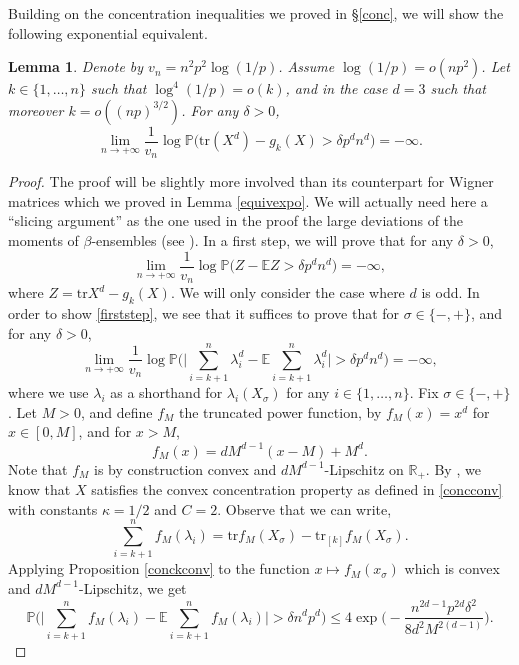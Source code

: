 \documentclass[aop,preprint]{imsart}
\newcommand\RR{\mathbb{R}}
\newcommand\PP{\mathbb{P}}
\newcommand\EE{\mathbb{E}}
\newcommand\tr{\mathrm{tr}}
\numberwithin{equation}{section}
\theoremstyle{definition}
\theoremstyle{plain}
\newtheorem{Lem}[Def]{Lemma}
\theoremstyle{remark}
\begin{document}
Building on the concentration inequalities we proved in \S \ref{conc}, we will show the following exponential equivalent.
\begin{Lem}\label{equiER}Denote by $v_n=n^2 p^2 \log (1/p)$. Assume $\log(1/p) = o(np^2)$. Let $k \in \{1,\ldots,n\}$ such that $  \log^4(1/p) = o(k)$, and in the case $d=3$ such that moreover $k =o((np)^{3/2})$. For any $\delta>0$,
$$ \lim_{n\to +\infty} \frac{1}{v_n} \log \PP\big( \tr (X^d) - g_k(X)>\delta p^dn^d\big) = -\infty.$$ 
\end{Lem}
\begin{proof}
The proof will be slightly more involved than its counterpart for Wigner matrices which we proved in Lemma \ref{equivexpo}. We will actually need here a ``slicing argument'' as the one used in the proof the large deviations of the moments of $\beta$-ensembles (see \cite[Proposition 3.5]{LDPtr}).
In a first step, we will prove that for any $\delta>0$, 
\begin{equation} \label{firststep} \lim_{n\to +\infty} \frac{1}{v_n} \log \PP\big( Z - \EE Z>\delta p^dn^d\big) = -\infty,\end{equation}
where $Z = \tr X^d - g_k(X)$.
We will only consider the case where $d$ is odd. In order to show \eqref{firststep}, we see that it suffices to prove that for $\sigma \in \{ -,+\}$, and for any $\delta>0$,
\begin{equation} \label{concen} \lim_{n\to +\infty} \frac{1}{v_n} \log \PP\big( \big|\sum_{i=k+1}^n \lambda_i^d - \EE \sum_{i=k+1}^n \lambda_i^d \big|>\delta p^dn^d\big) = -\infty,\end{equation}
where we use $\lambda_i$ as a shorthand for $\lambda_i(X_\sigma)$ for any $i\in\{1,\ldots,n\}$. Fix $\sigma \in \{ -,+\}$.
Let $M>0$, and define $f_M$ the truncated power function, by $f_M(x) = x^d$ for $x\in [0,M]$, and for $x>M$,
$$f_M(x) =
dM^{d-1}(x-M) +M^d.$$
Note that $f_M$ is by construction convex and $dM^{d-1}$-Lipschitz on $\RR_+$. 
By \cite[Theorem 8.6]{BLM}, we know that $X$ satisfies the convex concentration property as defined in \ref{concconv} with constants $\kappa = 1/2$ and $C=2$. Observe that we can write,
$$ \sum_{i=k+1}^n f_M(\lambda_i) = \tr f_M(X_\sigma) - \tr_{[k]}f_M(X_\sigma).$$
Applying Proposition \ref{conckconv} to the function $x \mapsto f_M(x_\sigma)$ which is convex and $dM^{d-1}$-Lipschitz, we get 
\begin{equation} \label{conctruncER} \PP\Big(\big| \sum_{i=k+1}^{n} f_M(\lambda_i)  - \EE \sum_{i=k+1}^{n} f_M(\lambda_i)  | >\delta n^dp^d \Big) \leq 4\exp\Big( - \frac{n^{2d-1}p^{2d} \delta^2}{8 d^2M^{2(d-1)}}\Big).\end{equation}

\end{proof}
\end{document}
